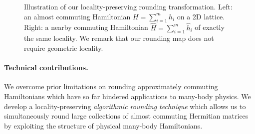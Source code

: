 \documentclass[11pt]{article}
\theoremstyle{plain}
\begin{document}
\begin{figure}[t]
\caption{Illustration of our locality-preserving rounding transformation. 
Left: an almost commuting Hamiltonian $H=\sum_{i=1}^m h_i$ on a 2D lattice. 
Right: a nearby commuting Hamiltonian $\hat{H}=\sum_{i=1}^m \hat{h}_i$ of exactly the same locality. We remark that our rounding map does not require geometric locality.}
\label{fig:rounding}
\end{figure}




\paragraph{Technical contributions.}

We overcome prior limitations on rounding 
approximately commuting Hamiltonians which have so far hindered 
applications to many-body physics. We develop a locality-preserving \emph{algorithmic rounding technique} which allows us to 
simultaneously
round large collections of almost commuting Hermitian matrices by exploiting the structure
of physical many-body Hamiltonians.
\end{document}
